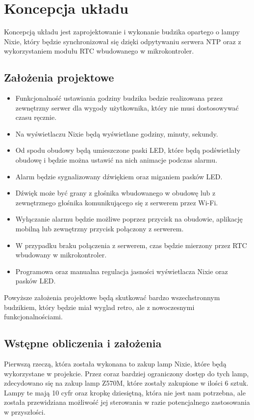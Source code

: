 \documentclass{article}
\begin{document}
\section{Koncepcja układu}
Koncepcją układu jest zaprojektowanie i wykonanie budzika opartego o lampy Nixie, który będzie synchronizował się dzięki odpytywaniu serwera NTP oraz
z wykorzystaniem modułu RTC wbudowanego w mikrokontroler.

\subsection{Założenia projektowe}
\begin{itemize}
    \item Funkcjonalność ustawiania godziny budzika bedzie realizowana przez zewnętrzny serwer dla wygody użytkownika, który nie musi dostosowywać czasu ręcznie.
    \item Na wyświetlaczu Nixie będą wyświetlane godziny, minuty, sekundy.
    \item Od spodu obudowy będą umieszczone paski LED, które będą podświetlały obudowę i będzie można ustawić na nich animacje podczas alarmu.
    \item Alarm będzie sygnalizowany dźwiękiem oraz miganiem pasków LED.
    \item Dźwięk może być grany z głośnika wbudowanego w obudowę lub z zewnętrznego głośnika komunikującego się z serwerem przez Wi-Fi.
    \item Wyłączanie alarmu będzie możliwe poprzez przycisk na obudowie, aplikację mobilną lub zewnętrzny przycisk połączony z serwerem.
    \item W przypadku braku połączenia z serwerem, czas będzie mierzony przez RTC wbudowany w mikrokontroler.
    \item Programowa oraz manualna regulacja jasności wyświetlacza Nixie oraz pasków LED.
\end{itemize}

Powyższe założenia projektowe będą skutkować bardzo wszechstronnym budzikiem, który będzie miał wyglad retro,
ale z nowoczesnymi funkcjonalnościami.

\subsection{Wstępne obliczenia i założenia}

Pierwszą rzeczą, która została wykonana to zakup lamp Nixie, które będą wykorzystane w projekcie. 
Przez coraz bardziej ograniczony dostęp do tych lamp, 
zdecydowano się na zakup lamp Z570M, które zostały zakupione w ilości 6 sztuk. Lampy te mają 10 cyfr oraz kropkę dziesiętną,
która nie jest nam potrzebna, ale została przewidziana możliwość jej sterowania w razie potencjalnego zastosowania w przyszłości.
\end{document}

